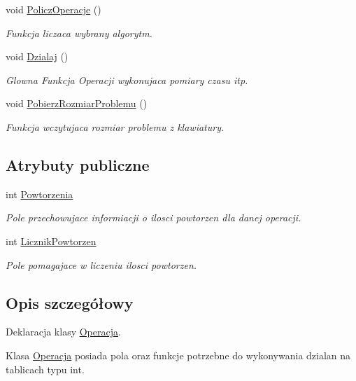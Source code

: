 \begin{DoxyCompactItemize}
void \hyperlink{class_operacja_add37253efa90cee5fa332cde6e163bab}{Policz\-Operacje} ()
\begin{DoxyCompactList}\small\item\em Funkcja liczaca wybrany algorytm. \end{DoxyCompactList}\item 
void \hyperlink{class_operacja_add48398ebfeae90a0d1b58a31962fd7d}{Dzialaj} ()
\begin{DoxyCompactList}\small\item\em Glowna Funkcja Operacji wykonujaca pomiary czasu itp. \end{DoxyCompactList}\item 
void \hyperlink{class_operacja_afa1d33f2045ce668becc90b56c1b6907}{Pobierz\-Rozmiar\-Problemu} ()
\begin{DoxyCompactList}\small\item\em Funkcja wczytujaca rozmiar problemu z klawiatury. \end{DoxyCompactList}\end{DoxyCompactItemize}
\subsection*{Atrybuty publiczne}
\begin{DoxyCompactItemize}
\item 
int \hyperlink{class_operacja_aa568b17d05f31132b3d97eb5b7e93d61}{Powtorzenia}
\begin{DoxyCompactList}\small\item\em Pole przechowujace informiacji o ilosci powtorzen dla danej operacji. \end{DoxyCompactList}\item 
int \hyperlink{class_operacja_a9af6bfee62f233a584f368a626e8329e}{Licznik\-Powtorzen}
\begin{DoxyCompactList}\small\item\em Pole pomagajace w liczeniu ilosci powtorzen. \end{DoxyCompactList}\end{DoxyCompactItemize}


\subsection{Opis szczegółowy}
Deklaracja klasy \hyperlink{class_operacja}{Operacja}. 

Klasa \hyperlink{class_operacja}{Operacja} posiada pola oraz funkcje potrzebne do wykonywania dzialan na tablicach typu int. 

